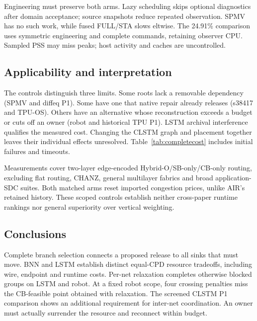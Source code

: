 \documentclass[conference,10pt]{IEEEtran}
\begin{document}
Engineering must preserve both arms. Lazy scheduling skips optional diagnostics after domain acceptance; source snapshots reduce repeated observation. SPMV has no such work, while fused FULL/STA slows eltwise. The 24.91\% comparison uses symmetric engineering and complete commands, retaining observer CPU. Sampled PSS may miss peaks; host activity and caches are uncontrolled.

\subsection{Applicability and interpretation}
The controls distinguish three limits. Some roots lack a removable dependency (SPMV and diffeq P1). Some have one that native repair already releases (s38417 and TPU-OS). Others have an alternative whose reconstruction exceeds a budget or cuts off an owner (robot and historical TPU P1). LSTM archival interference qualifies the measured cost. Changing the CLSTM graph and placement together leaves their individual effects unresolved. Table~\ref{tab:completecost} includes initial failures and timeouts.

Measurements cover two-layer edge-encoded Hybrid-O/SB-only/CB-only routing, excluding flat routing, CHANZ, general multilayer fabrics and broad application-SDC suites. Both matched arms reset imported congestion prices, unlike AIR's retained history. These scoped controls establish neither cross-paper runtime rankings nor general superiority over vertical weighting.

\subsection{Conclusions}
Complete branch selection connects a proposed release to all sinks that must move. BNN and LSTM establish distinct equal-CPD resource tradeoffs, including wire, endpoint and runtime costs. Per-net relaxation completes otherwise blocked groups on LSTM and robot. At a fixed robot scope, four crossing penalties miss the CB-feasible point obtained with relaxation. The screened CLSTM P1 comparison shows an additional requirement for inter-net coordination. An owner must actually surrender the resource and reconnect within budget.


\end{document}
